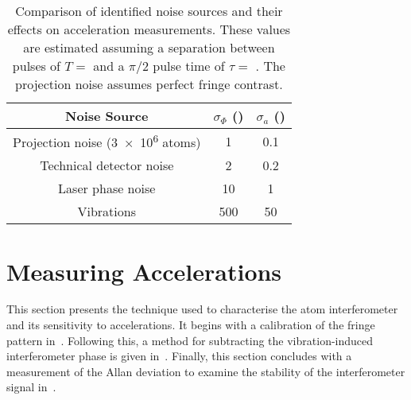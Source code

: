 \begin{table}[htpb!]
  \centering
  \begin{tabular}{ccc}
    \toprule
    Noise Source  & $\sigma_{\Phi}$  (\sivalue{}{\milli\radian})  &\(\sigma_a\)
    (\sivalue{}{\micro\meter\per\s\squared}) \\
    \midrule
    Projection noise (\num{3e6} atoms) & 1 & 0.1 \\
    Technical detector noise & 2 & 0.2 \\
    Laser phase noise  & 10 & 1 \\
    Vibrations & 500 & 50 \\
    \bottomrule
  \end{tabular}
  \caption[Comparison of known noise sources.]{Comparison of
    identified noise sources and their effects on
  acceleration measurements. These values are estimated assuming a
separation between pulses of \(T = \)  and a \(\pi/2\)
pulse time of \(\tau = \) . The projection noise
assumes perfect fringe contrast.}
  \label{tab:noise_sources}
\end{table}
\section{Measuring Accelerations}\label{sec:atomint_accelerations}
This section presents the technique used to characterise the atom interferometer
and its sensitivity to accelerations. It begins with a calibration of
the fringe pattern in~. Following this, a
method for subtracting the vibration-induced interferometer phase is given
in~. Finally, this section concludes with
a measurement of the Allan deviation to examine the stability of the
interferometer signal in~.
